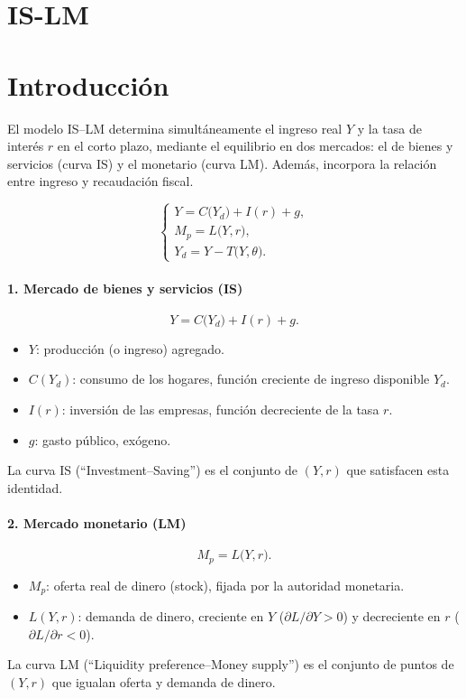 \documentclass{article}
\begin{document}
\newpage
\section{IS-LM}




\section*{Introducción}


El modelo IS–LM determina simultáneamente el ingreso real \(Y\) y la tasa de interés \(r\) en el corto plazo, mediante el equilibrio en dos mercados: el de bienes y servicios (curva IS) y el monetario (curva LM). Además, incorpora la relación entre ingreso y recaudación fiscal.

\[
\begin{cases}
Y = C\bigl(Y_d\bigr) + I(r) + g,\\[6pt]
M_p = L\bigl(Y,r\bigr),\\[6pt]
Y_d = Y - T\bigl(Y,\theta\bigr).
\end{cases}
\]

\bigskip

\paragraph{1. Mercado de bienes y servicios (IS)}  
\[
Y = C\bigl(Y_d\bigr) + I(r) + g.
\]
\begin{itemize}
  \item \(Y\): producción (o ingreso) agregado.
  \item \(C(Y_d)\): consumo de los hogares, función creciente de ingreso disponible \(Y_d\).
  \item \(I(r)\): inversión de las empresas, función decreciente de la tasa \(r\).
  \item \(g\): gasto público, exógeno.
\end{itemize}
La curva IS (“Investment–Saving”) es el conjunto de \((Y,r)\) que satisfacen esta identidad. 
\bigskip

\paragraph{2. Mercado monetario (LM)}  
\[
M_p = L\bigl(Y,r\bigr).
\]
\begin{itemize}
  \item \(M_p\): oferta real de dinero (stock), fijada por la autoridad monetaria.
  \item \(L(Y,r)\): demanda de dinero, creciente en \(Y\) (\(\partial L/\partial Y>0\)) y decreciente en \(r\) (\(\partial L/\partial r<0\)).
\end{itemize}
La curva LM (“Liquidity preference–Money supply”) es el conjunto de puntos de \((Y,r)\) que igualan oferta y demanda de dinero. 
\end{document}
